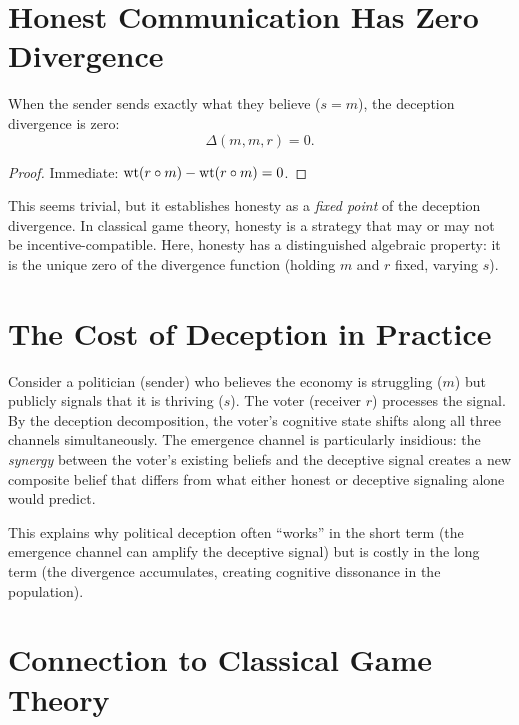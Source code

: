 \section{Honest Communication Has Zero Divergence}

\begin{theorem}
When the sender sends exactly what they believe ($s = m$), the deception divergence is zero:
\[
\Delta(m, m, r) = 0.
\]
\end{theorem}

\begin{proof}
Immediate: $\operatorname{wt}(r \circ m) - \operatorname{wt}(r \circ m) = 0$.
\end{proof}

\begin{remark}
This seems trivial, but it establishes honesty as a \emph{fixed point} of the deception divergence. In classical game theory, honesty is a strategy that may or may not be incentive-compatible. Here, honesty has a distinguished algebraic property: it is the unique zero of the divergence function (holding $m$ and $r$ fixed, varying $s$).
\end{remark}

\section{The Cost of Deception in Practice}

\begin{example}
Consider a politician (sender) who believes the economy is struggling ($m$) but publicly signals that it is thriving ($s$). The voter (receiver $r$) processes the signal. By the deception decomposition, the voter's cognitive state shifts along all three channels simultaneously. The emergence channel is particularly insidious: the \emph{synergy} between the voter's existing beliefs and the deceptive signal creates a new composite belief that differs from what either honest or deceptive signaling alone would predict.

This explains why political deception often ``works'' in the short term (the emergence channel can amplify the deceptive signal) but is costly in the long term (the divergence accumulates, creating cognitive dissonance in the population).
\end{example}

\section{Connection to Classical Game Theory}

